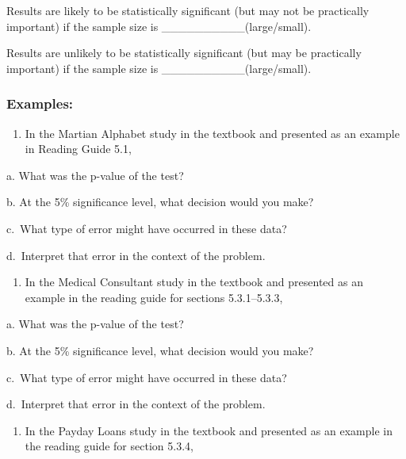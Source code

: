 \documentclass[
]{report}
\providecommand{\tightlist}{%
  \setlength{\itemsep}{0pt}\setlength{\parskip}{0pt}}
\newcommand{\rgs}{\vspace{12pt}} %
\newcommand{\rgi}{\hspace{24pt}}  %
\begin{document}
Results are likely to be statistically significant (but may not be practically important) if the sample size is \_\_\_\_\_\_\_\_\_\_(large/small).
\rgs

Results are unlikely to be statistically significant (but may be practically important) if the sample size is \_\_\_\_\_\_\_\_\_\_(large/small).
\rgs

\hypertarget{examples}{%
\subsubsection*{Examples:}\label{examples}}

\begin{enumerate}
\def\labelenumi{\arabic{enumi}.}
\tightlist
\item
  In the Martian Alphabet study in the textbook and presented as an example in Reading Guide 5.1,
\end{enumerate}

\rgi a. What was the p-value of the test?
\rgs

\rgi b. At the 5\% significance level, what decision would you make?
\rgs

\rgi c.~What type of error might have occurred in these data?
\rgs

\rgi d.~Interpret that error in the context of the problem.
\rgs
\rgs

\begin{enumerate}
\def\labelenumi{\arabic{enumi}.}
\setcounter{enumi}{1}
\tightlist
\item
  In the Medical Consultant study in the textbook and presented as an example in the reading guide for sections 5.3.1--5.3.3,
\end{enumerate}

\rgi a. What was the p-value of the test?
\rgs

\rgi b. At the 5\% significance level, what decision would you make?
\rgs

\rgi c.~What type of error might have occurred in these data?
\rgs

\rgi d.~Interpret that error in the context of the problem.
\rgs
\rgs

\begin{enumerate}
\def\labelenumi{\arabic{enumi}.}
\setcounter{enumi}{2}
\tightlist
\item
  In the Payday Loans study in the textbook and presented as an example in the reading guide for section 5.3.4,
\end{enumerate}
\end{document}
